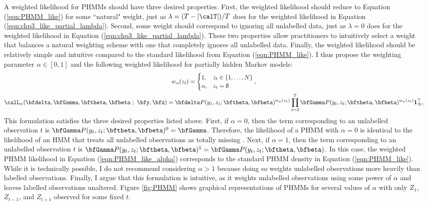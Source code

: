 A weighted likelihood for PHMMs should have three desired properties. First, the weighted likelihood should reduce to Equation (\ref{eqn:PHMM_like}) for some ``natural" weight, just as $\lambda = (T-|\calT|)/T$ does for the weighted likelihood in Equation (\ref{eqn:chp3_like_partial_lambda}). Second, some weight should correspond to ignoring all unlabelled data, just as $\lambda = 0$ does for the weighted likelihood in Equation (\ref{eqn:chp3_like_partial_lambda}). These two properties allow practitioners to intuitively select a weight that balances a natural weighting scheme with one that completely ignores all unlabelled data. Finally, the weighted likelihood should be relatively simple and intuitive compared to the standard likelihood from Equation (\ref{eqn:PHMM_like}). I thus propose the weighting parameter $\alpha \in [0,1]$ and the following weighted likelihood for partially hidden Markov models:
%
\begin{gather}
    w_\alpha(z_t) = \begin{cases}
        1,        & z_t \in \{1,\ldots,N\} \\
        \alpha,   & z_t = \emptyset
    \end{cases}, \\
    \calL_\alpha(\bfdelta, \bfGamma, \bftheta,\bfbeta ~;~ \bfy,\bfz) = \bfdelta P(y_1,z_1;\bftheta,\bfbeta)^{w_\alpha(z_1)} \prod_{t=2}^T \bfGamma P(y_t,z_t;\bftheta,\bfbeta)^{w_\alpha(z_t)} \mathbf{1}^\top_N,
    \label{eqn:PHMM_like_alpha}
\end{gather} 
%
This formulation satisfies the three desired properties listed above. First, if $\alpha = 0$, then the term corresponding to an unlabelled observation $t$ is $\bfGamma P(y_t,z_t;\bftheta,\bfbeta)^{0} = \bfGamma$. Therefore, the likelihood of a PHMM with $\alpha = 0$ is identical to the likelihood of an HMM that treats all unlabelled observations as totally missing \citep{Zucchini:2016}. Next, if $\alpha = 1$, then the term corresponding to an unlabelled observation $t$ is $\bfGamma P(y_t,z_t;\bftheta,\bfbeta)^{1} = \bfGamma P(y_t,z_t;\bftheta,\bfbeta)$. In this case, the weighted PHMM likelihood in Equation (\ref{eqn:PHMM_like_alpha}) corresponds to the standard PHMM density in Equation (\ref{eqn:PHMM_like}). While it is technically possible, I do not recommend considering $\alpha > 1$ because doing so weights unlabelled observations more heavily than labelled observations. Finally, I argue that this formulation is intuitive, as it weights unlabelled observations using some power of $\alpha$ and leaves labelled observations unaltered. Figure \ref{fig:PHMM} shows graphical representations of PHMMs for several values of $\alpha$ with only $Z_1$, $Z_{t-1}$, and $Z_{t+1}$ observed for some fixed $t$.

